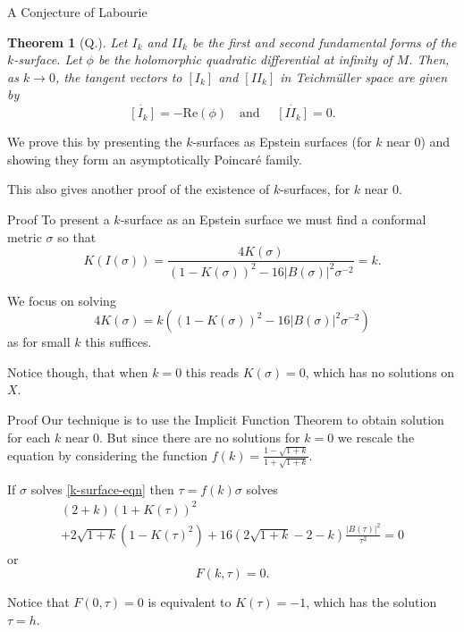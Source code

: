 \documentclass[professionalfont]{beamer}
\newtheorem{thm}{Theorem}[section]
\newcommand{\two}{I\!I}
\begin{document}
\begin{frame}{A Conjecture of Labourie}
 
\begin{thm}[Q.] \label{labourie-conjecture-proof}
Let $I_k$ and $\two_k$ be the first and second fundamental forms of the $k$-surface. 
Let $\phi$ be the holomorphic quadratic differential at infinity of $M$. 
Then, as $k \to 0$, the tangent vectors to $[I_k]$ and $[\two_k]$ in Teichm\"uller space are given by 
\[
\dot{[I_k]} = - \mathrm{Re}(\phi) \quad \text{and } \quad   \dot{[\two_k]} = 0.
\]
\end{thm} \pause

\vspace{0.5cm}

We prove this by presenting the $k$-surfaces as Epstein surfaces (for $k$ near 0) and showing they form an asymptotically Poincar\'e family.
\newline

This also gives another proof of the existence of $k$-surfaces, for $k$ near 0.

\end{frame}




\begin{frame}{Proof}
To present a $k$-surface as an Epstein surface we must find a conformal metric $\sigma$ so that
\[
K(I(\sigma)) = \frac{4K(\sigma)}{(1-K(\sigma))^2 - 16|B(\sigma)|^2\sigma^{-2}} = k.
\] \pause

We focus on solving 
\begin{equation}\tag{$\ast$}\label{k-surface-eqn}
4K(\sigma) = k \left((1-K(\sigma))^2 - 16|B(\sigma)|^2\sigma^{-2} \right)
\end{equation}
as for small $k$ this suffices. 
\newline \pause


Notice though, that when $k=0$ this reads $K(\sigma) = 0$, which has no solutions on $X$.
\end{frame}




\begin{frame}{Proof}
Our technique is to use the Implicit Function Theorem to obtain solution for each $k$ near 0. But since there are no solutions for $k = 0$ we rescale the equation by considering the function $f(k) = \frac{1-\sqrt{1+k}}{1+\sqrt{1+k}}$. 
\newline \pause

If $\sigma$ solves \eqref{k-surface-eqn} then $\tau = f(k)\sigma$ solves 
\begin{multline*}
(2+k)(1+K(\tau))^2  \\ + 2\sqrt{1+k}\left(1-K(\tau)^2 \right) +16\left(2\sqrt{1+k} - 2 - k  \right)\frac{|B(\tau)|^2}{\tau^2} = 0
\end{multline*}or 
\[
F(k,\tau) = 0.
\]\pause


Notice that $F(0,\tau) = 0$ is equivalent to $K(\tau) = -1$, which has the solution $\tau = h$. 
\end{frame}
\end{document}
